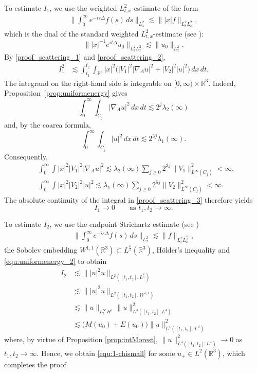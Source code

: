 \documentclass[10pt%
]{amsart}
\numberwithin{equation}{section}
\newcommand{\R}{\mathbb{R}}
\newcommand{\Z}{\mathbb{Z}}
\theoremstyle{definition}
\begin{document}
To estimate $I_1$, we use the weighted $L^2_{t,x}$ estimate of the form
\begin{align}
	\label{proof_scattering_2}
	\Big\|\int_0^\infty e^{-is\Delta}f(s)\,ds\Big\|_{L^2_x}\lesssim \||x|f\|_{L^2_tL^2_x},
\end{align}
which is the dual of the standard weighted $L^2_{t,x}$-estimate (see \cite[Theorem 1]{KatoYajima}):
$$
\||x|^{-1}e^{it\Delta}u_0\|_{L^2_tL^2_x}\lesssim \|u_0\|_{L^2_x}. 
$$
By \eqref{proof_scattering_1} and \eqref{proof_scattering_2},
\begin{align}
 I_1^2
 &\lesssim
 \int_{t_1}^{t_2}\!\int_{\R^3}|x|^2
 \big(|V_1|^2|\nabla_Au|^2+|V_2|^2|u|^2\big)\,dx\,dt.
 \label{proof_scattering_3}
\end{align}
The integrand on the right-hand side is integrable on $[0,\infty)\times\R^3$. Indeed, Proposition~\ref{prop:uniformenergy} gives
\[
\int_0^\infty\!\int_{C_j}|\nabla_Au|^2\,dx\,dt
\lesssim2^j\lambda_2(\infty)
\]
and, by the coarea formula,
\[
\int_0^\infty\!\int_{C_j}|u|^2\,dx\,dt
\lesssim2^{3j}\lambda_1(\infty).
\]
Consequently,
\begin{align*}
&\int_0^\infty\!\int |x|^2|V_1|^2|\nabla_Au|^2
\lesssim\lambda_2(\infty)\sum_{j\ge0}2^{3j}\|V_1\|_{L^\infty(C_j)}^2<\infty,\\
&\int_0^\infty\!\int |x|^2|V_2|^2|u|^2
\lesssim\lambda_1(\infty)\sum_{j\ge0}2^{5j}\|V_2\|_{L^\infty(C_j)}^2<\infty.
\end{align*}
The absolute continuity of the integral in \eqref{proof_scattering_3} therefore yields
\[
I_1\longrightarrow0
\qquad\text{as }t_1,t_2\to\infty.
\]

To estimate $I_2$, we use the endpoint Strichartz estimate (see \cite{KeelTao})
\begin{align*}
	\Big\|\int_0^\infty e^{-is\Delta}f(s)\,ds\Big\|_{L^2_x}\lesssim \|f\|_{L^2_tL^{\frac65}_x},
\end{align*}
the Sobolev embedding $W^{1,1}(\R^3) \subset L^{\frac65}(\R^3)$, H\"older's inequality and \eqref{equ:uniformenergy_2} to obtain
\begin{align*}
	I_2&\lesssim \||u|^{2}u\|_{L^2([t_1,t_2],L^{\frac65})}\\
	&\lesssim \||u|^{2}u\|_{L^2([t_1,t_2],W^{1,1})}\\
	&\lesssim \|u\|_{L^\infty_tH^1}\|u\|_{L^4([t_1,t_2],L^4)}^2\\
	&\lesssim \big(M(u_0)+E(u_0)\big)\|u\|_{L^4([t_1,t_2],L^4)}^2
\end{align*}
where, by virtue of Proposition \ref{prop:intMorest}, $\|u\|_{L^4([t_1,t_2],L^4)}^2\to 0$ as $t_1,t_2\to \infty$. 
Hence, we obtain \eqref{equ:1-chismall} for some $u_+\in L^2(\R^3)$, which completes the proof.
\end{document}
